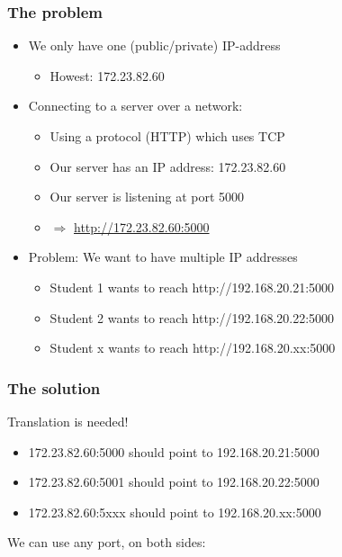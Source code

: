 \documentclass{article}
\begin{document}
\subsubsection{The problem}

\begin{itemize}
    \item We only have one (public/private) IP-address
    \begin{itemize}
        \item Howest: 172.23.82.60
    \end{itemize}
    \item Connecting to a server over a network:
    \begin{itemize}
        \item Using a protocol (HTTP) which uses TCP
        \item Our server has an IP address: 172.23.82.60
        \item Our server is listening at port 5000
        \item $\Rightarrow$ \url{http://172.23.82.60:5000}
    \end{itemize}
    \item Problem: We want to have multiple IP addresses
    \begin{itemize}
        \item Student 1 wants to reach http://192.168.20.21:5000
        \item Student 2 wants to reach http://192.168.20.22:5000
        \item Student x  wants to reach http://192.168.20.xx:5000
    \end{itemize}
\end{itemize}

\subsubsection{The solution}

Translation is needed!

\begin{itemize}
    \item 172.23.82.60:5000 should point to 192.168.20.21:5000
    \item 172.23.82.60:5001 should point to 192.168.20.22:5000
    \item 172.23.82.60:5xxx should point to 192.168.20.xx:5000
\end{itemize}

We can use any port, on both sides:
\end{document}
